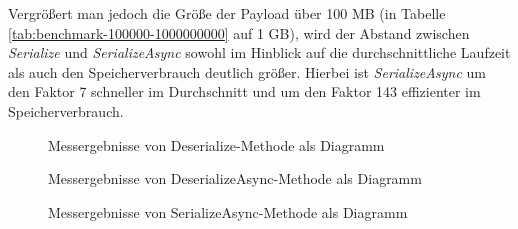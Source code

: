 Vergrößert man jedoch die Größe der Payload über 100 MB (in Tabelle \ref{tab:benchmark-100000-1000000000} auf 1 GB), wird der Abstand zwischen \textit{Serialize} und \textit{SerializeAsync} sowohl im Hinblick auf die durchschnittliche Laufzeit als auch den Speicherverbrauch deutlich größer. Hierbei ist \textit{SerializeAsync} um den Faktor 7 schneller im Durchschnitt und um den Faktor 143 effizienter im Speicherverbrauch.

\begin{figure}[h]
    \centering
    \caption{Messergebnisse von Deserialize-Methode als Diagramm}
    \label{fig:messergebnisse-deserialize}
\end{figure}

\begin{figure}[h]
    \centering
    \caption{Messergebnisse von DeserializeAsync-Methode als Diagramm}
    \label{fig:messergebnisse-deserialize-async}
\end{figure}

\begin{figure}[h]
    \centering
    \caption{Messergebnisse von SerializeAsync-Methode als Diagramm}
    \label{fig:messergebnisse-serialize-async}
\end{figure}

